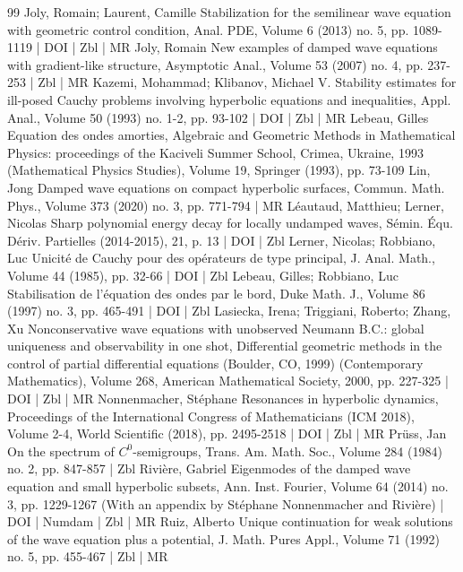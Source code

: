 \begin{thebibliography}{99}
Joly, Romain; Laurent, Camille Stabilization for the semilinear wave equation with geometric control condition, Anal. PDE, Volume 6 (2013) no. 5, pp. 1089-1119 | DOI | Zbl | MR
Joly, Romain New examples of damped wave equations with gradient-like structure, Asymptotic Anal., Volume 53 (2007) no. 4, pp. 237-253 | Zbl | MR
Kazemi, Mohammad; Klibanov, Michael V. Stability estimates for ill-posed Cauchy problems involving hyperbolic equations and inequalities, Appl. Anal., Volume 50 (1993) no. 1-2, pp. 93-102 | DOI | Zbl | MR
Lebeau, Gilles Equation des ondes amorties, Algebraic and Geometric Methods in Mathematical Physics: proceedings of the Kaciveli Summer School, Crimea, Ukraine, 1993 (Mathematical Physics Studies), Volume 19, Springer (1993), pp. 73-109
Lin, Jong Damped wave equations on compact hyperbolic surfaces, Commun. Math. Phys., Volume 373 (2020) no. 3, pp. 771-794 | MR
Léautaud, Matthieu; Lerner, Nicolas Sharp polynomial energy decay for locally undamped waves, Sémin. Équ. Dériv. Partielles (2014-2015), 21, p. 13 | DOI | Zbl
Lerner, Nicolas; Robbiano, Luc Unicité de Cauchy pour des opérateurs de type principal, J. Anal. Math., Volume 44 (1985), pp. 32-66 | DOI | Zbl
Lebeau, Gilles; Robbiano, Luc Stabilisation de l’équation des ondes par le bord, Duke Math. J., Volume 86 (1997) no. 3, pp. 465-491 | DOI | Zbl
Lasiecka, Irena; Triggiani, Roberto; Zhang, Xu Nonconservative wave equations with unobserved Neumann B.C.: global uniqueness and observability in one shot, Differential geometric methods in the control of partial differential equations (Boulder, CO, 1999) (Contemporary Mathematics), Volume 268, American Mathematical Society, 2000, pp. 227-325 | DOI | Zbl | MR
Nonnenmacher, Stéphane Resonances in hyperbolic dynamics, Proceedings of the International Congress of Mathematicians (ICM 2018), Volume 2-4, World Scientific (2018), pp. 2495-2518 | DOI | Zbl | MR
Prüss, Jan On the spectrum of ${C}^0$-semigroups, Trans. Am. Math. Soc., Volume 284 (1984) no. 2, pp. 847-857 | Zbl
Rivière, Gabriel Eigenmodes of the damped wave equation and small hyperbolic subsets, Ann. Inst. Fourier, Volume 64 (2014) no. 3, pp. 1229-1267 (With an appendix by Stéphane Nonnenmacher and Rivière) | DOI | Numdam | Zbl | MR
Ruiz, Alberto Unique continuation for weak solutions of the wave equation plus a potential, J. Math. Pures Appl., Volume 71 (1992) no. 5, pp. 455-467 | Zbl | MR

\end{thebibliography}
